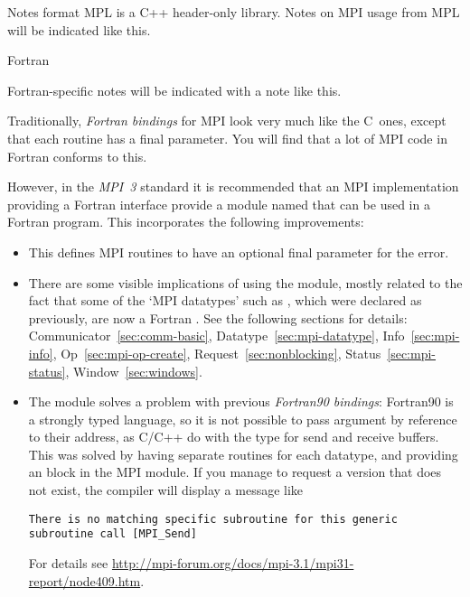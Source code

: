 \begin{mplnote}{Notes format}
MPL
is a C++ header-only library.
Notes on MPI usage from MPL will be indicated like this.
\end{mplnote}


 {Fortran}

\begin{fortrannote}
  Fortran-specific notes will be indicated with a note like this.
\end{fortrannote}

Traditionally, \emph{Fortran bindings} for MPI look very much like the C~ones,
except that each routine has a final 
parameter.
You will find that a lot of MPI code in Fortran conforms to this.

%
However, in the \emph{MPI~3}%
 standard it is recommended that
an MPI implementation providing a Fortran interface provide a
module named  that can be used in a Fortran program.
This incorporates the following improvements:
\begin{itemize}
\item
  This defines MPI routines to have an optional final parameter for the error.
\item 
  There are some visible implications of using the  module,
  mostly related to the fact that some of the `MPI datatypes' such as
  , which were declared as 
  previously, are now a Fortran .
  See the following sections for details:
  Communicator~\ref{sec:comm-basic}, Datatype~\ref{sec:mpi-datatype},
  Info~\ref{sec:mpi-info}, Op~\ref{sec:mpi-op-create},
  Request~\ref{sec:nonblocking}, Status~\ref{sec:mpi-status},
  Window~\ref{sec:windows}.
\item
  The  module solves a problem with previous
  \emph{Fortran90 bindings}:
  Fortran90 is a strongly typed language, so it is not possible to pass
  argument by reference to their address, as C/C++ do with the 
  type for send and receive buffers. This was solved by having
  separate routines for each datatype, and providing an  block
  in the MPI module. If you manage to request a version that does not exist,
  the compiler will display a message like
\begin{verbatim}
There is no matching specific subroutine for this generic subroutine call [MPI_Send]
\end{verbatim}
%
For details see
\url{http://mpi-forum.org/docs/mpi-3.1/mpi31-report/node409.htm}.
\end{itemize}

